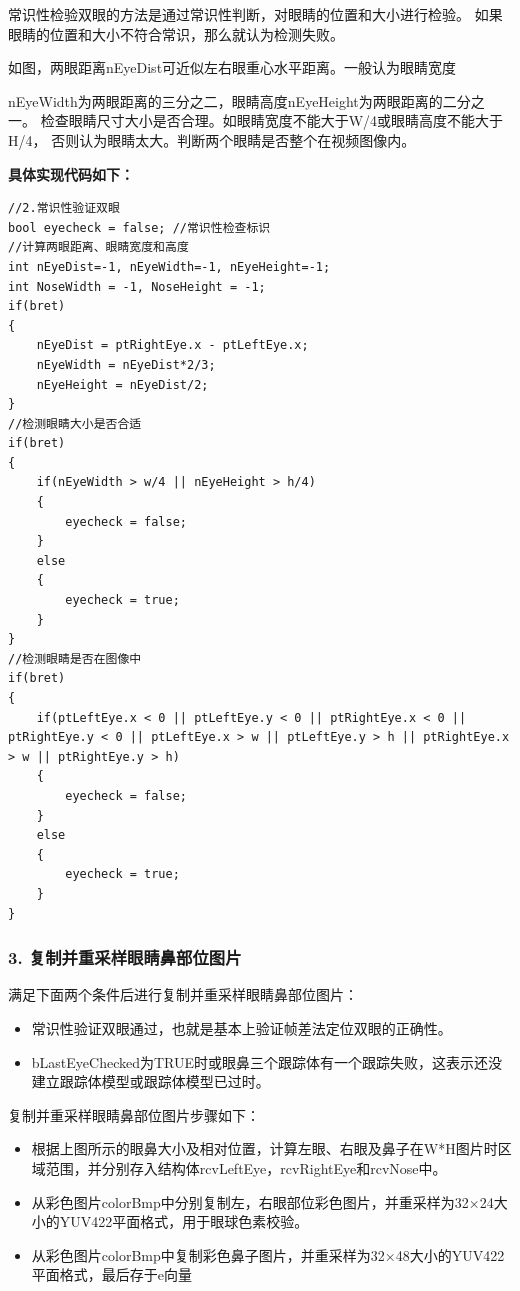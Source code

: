 \documentclass[12pt,hyperref,a4paper,UTF8]{ctexart}
\begin{document}
        常识性检验双眼的方法是通过常识性判断，对眼睛的位置和大小进行检验。
        如果眼睛的位置和大小不符合常识，那么就认为检测失败。

        如图，两眼距离nEyeDist可近似左右眼重心水平距离。一般认为眼睛宽度
        
        nEyeWidth为两眼距离的三分之二，眼睛高度nEyeHeight为两眼距离的二分之一。
        检查眼睛尺寸大小是否合理。如眼睛宽度不能大于W/4或眼睛高度不能大于H/4，
        否则认为眼睛太大。判断两个眼睛是否整个在视频图像内。


        \textbf{具体实现代码如下：}
        \begin{lstlisting}[caption={常识性检验双眼}, label={lst:example}]
//2.常识性验证双眼
bool eyecheck = false; //常识性检查标识
//计算两眼距离、眼睛宽度和高度
int nEyeDist=-1, nEyeWidth=-1, nEyeHeight=-1;
int NoseWidth = -1, NoseHeight = -1;
if(bret)
{
    nEyeDist = ptRightEye.x - ptLeftEye.x;
    nEyeWidth = nEyeDist*2/3;
    nEyeHeight = nEyeDist/2;
}
//检测眼睛大小是否合适
if(bret)
{
    if(nEyeWidth > w/4 || nEyeHeight > h/4)
    {
        eyecheck = false;
    }
    else
    {
        eyecheck = true;
    }
}
//检测眼睛是否在图像中
if(bret)
{
    if(ptLeftEye.x < 0 || ptLeftEye.y < 0 || ptRightEye.x < 0 || ptRightEye.y < 0 || ptLeftEye.x > w || ptLeftEye.y > h || ptRightEye.x > w || ptRightEye.y > h)
    {
        eyecheck = false;
    }
    else
    {
        eyecheck = true;
    }
}
        \end{lstlisting}

        \subsubsection*{\large \textbf{3. 复制并重采样眼睛鼻部位图片}}
        满足下面两个条件后进行复制并重采样眼睛鼻部位图片：
        \begin{itemize}
            \item 常识性验证双眼通过，也就是基本上验证帧差法定位双眼的正确性。
            \item bLastEyeChecked为TRUE时或眼鼻三个跟踪体有一个跟踪失败，这表示还没建立跟踪体模型或跟踪体模型已过时。
        \end{itemize}
        复制并重采样眼睛鼻部位图片步骤如下：
        \begin{itemize}
            \item 根据上图所示的眼鼻大小及相对位置，计算左眼、右眼及鼻子在W*H图片时区域范围，并分别存入结构体rcvLeftEye，rcvRightEye和rcvNose中。
            \item 从彩色图片colorBmp中分别复制左，右眼部位彩色图片，并重采样为32×24大小的YUV422平面格式，用于眼球色素校验。
            \item 从彩色图片colorBmp中复制彩色鼻子图片，并重采样为32×48大小的YUV422平面格式，最后存于e向量
        \end{itemize}
\end{document}
